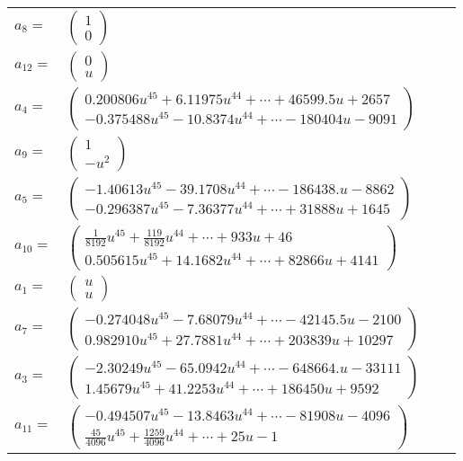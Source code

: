 \documentclass[1p]{elsarticle_modified}
\theoremstyle{definition}
\begin{document}
\begin{tabular}{m{7pt} m{180pt} m{7pt} m{180pt} }
\flushright $a_{8}=$&$\begin{pmatrix}1\\0\end{pmatrix}$ \\
\flushright $a_{12}=$&$\begin{pmatrix}0\\u\end{pmatrix}$ \\
\flushright $a_{4}=$&$\begin{pmatrix}0.200806 u^{45}+6.11975 u^{44}+\cdots+46599.5 u+2657\\-0.375488 u^{45}-10.8374 u^{44}+\cdots-180404 u-9091\end{pmatrix}$ \\
\flushright $a_{9}=$&$\begin{pmatrix}1\\- u^2\end{pmatrix}$ \\
\flushright $a_{5}=$&$\begin{pmatrix}-1.40613 u^{45}-39.1708 u^{44}+\cdots-186438. u-8862\\-0.296387 u^{45}-7.36377 u^{44}+\cdots+31888 u+1645\end{pmatrix}$ \\
\flushright $a_{10}=$&$\begin{pmatrix}\frac{1}{8192} u^{45}+\frac{119}{8192} u^{44}+\cdots+933 u+46\\0.505615 u^{45}+14.1682 u^{44}+\cdots+82866 u+4141\end{pmatrix}$ \\
\flushright $a_{1}=$&$\begin{pmatrix}u\\u\end{pmatrix}$ \\
\flushright $a_{7}=$&$\begin{pmatrix}-0.274048 u^{45}-7.68079 u^{44}+\cdots-42145.5 u-2100\\0.982910 u^{45}+27.7881 u^{44}+\cdots+203839 u+10297\end{pmatrix}$ \\
\flushright $a_{3}=$&$\begin{pmatrix}-2.30249 u^{45}-65.0942 u^{44}+\cdots-648664. u-33111\\1.45679 u^{45}+41.2253 u^{44}+\cdots+186450 u+9592\end{pmatrix}$ \\
\flushright $a_{11}=$&$\begin{pmatrix}-0.494507 u^{45}-13.8463 u^{44}+\cdots-81908 u-4096\\\frac{45}{4096} u^{45}+\frac{1259}{4096} u^{44}+\cdots+25 u-1\end{pmatrix}$ \\

\end{tabular}
\end{document}
